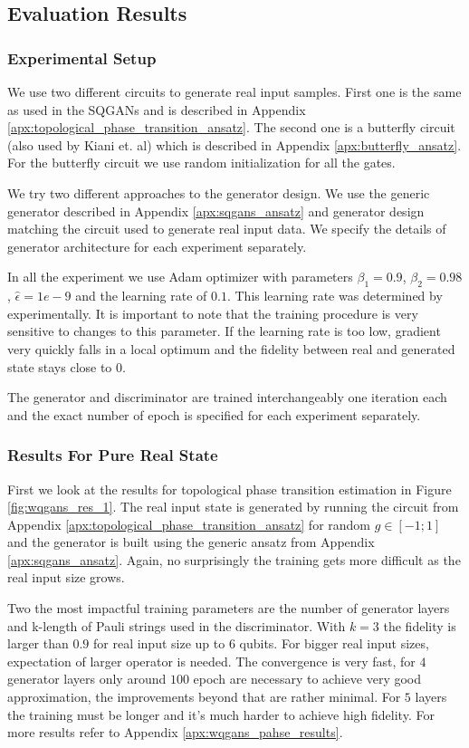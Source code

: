 \subsection{Evaluation Results}
\subsubsection{Experimental Setup}
We use two different circuits to generate real input samples. First one is the
same as used in the SQGANs and is described in Appendix
\ref{apx:topological_phase_transition_ansatz}.
The second one is a butterfly circuit (also used by Kiani et.
al\cite{kiani2021quantum}) which is described in Appendix
\ref{apx:butterfly_ansatz}. For the butterfly circuit we use random
initialization for all the gates.

We try two different approaches to the generator design. We use the generic
generator described in Appendix \ref{apx:sqgans_ansatz} and generator
design matching the circuit used to generate real input data. We specify the
details of generator architecture for each experiment separately.

In all the experiment we use Adam optimizer \cite{kingma2017adam} with
parameters $\beta_1 = 0.9$, $\beta_2=0.98$, $\hat{\epsilon} = 1e-9$ and the
learning rate of $0.1$. This learning rate was determined by experimentally. It
is important to note that the training procedure is very sensitive to changes to
this parameter. If the learning rate is too low, gradient very quickly falls in
a local optimum and the fidelity between real and generated state stays close to $0$.

The generator and discriminator are trained interchangeably one iteration each
and the exact number of epoch is specified for each experiment separately.
\subsubsection{Results For Pure Real State}
First we look at the results for topological phase transition estimation in
Figure \ref{fig:wqgans_res_1}. The real input state is generated by running the circuit from Appendix
\ref{apx:topological_phase_transition_ansatz} for random $g \in [-1; 1]$ and the
generator is built using the generic ansatz from Appendix
\ref{apx:sqgans_ansatz}. Again, no surprisingly the training gets more difficult
as the real input size grows.

Two the most impactful training parameters are the number of
generator layers and k-length of Pauli strings used in the discriminator. With
$k=3$ the fidelity is larger than $0.9$ for real input size up to $6$ qubits.
For bigger real input sizes, expectation of larger operator is needed. The convergence is
very fast, for $4$ generator layers only around $100$ epoch are necessary to
achieve very good approximation, the improvements beyond that are rather
minimal. For $5$ layers the training must be longer and it's much harder to
achieve high fidelity. For more results refer to Appendix \ref{apx:wqgans_pahse_results}.



